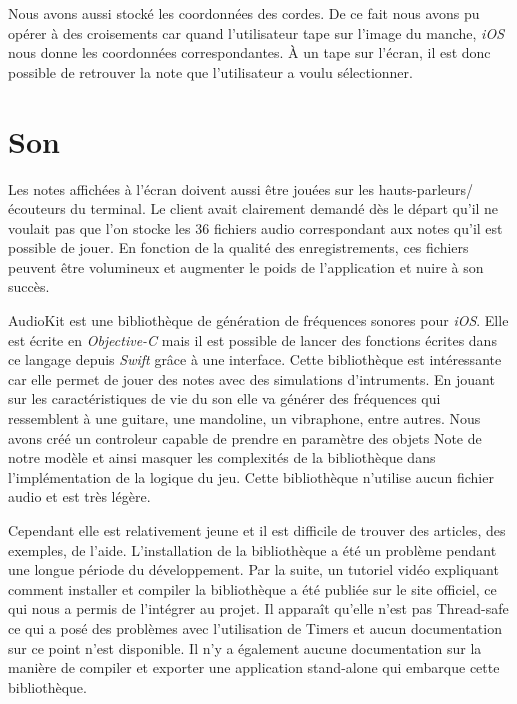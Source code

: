 \documentclass{scrreprt}
\begin{document}
Nous avons aussi stocké les coordonnées des cordes.
De ce fait nous avons pu opérer à des croisements car quand l'utilisateur tape sur l'image du manche, \textit{iOS} nous donne les coordonnées correspondantes.
À un tape sur l'écran, il est donc possible de retrouver la note que l'utilisateur a voulu sélectionner.
\newpage

\section{Son}
Les notes affichées à l'écran doivent aussi être jouées sur les hauts-parleurs/écouteurs du terminal.
Le client avait clairement demandé dès le départ qu'il ne voulait pas que l'on stocke les 36 fichiers audio correspondant aux notes qu'il est possible de jouer.
En fonction de la qualité des enregistrements, ces fichiers peuvent être volumineux et augmenter le poids de l'application et nuire à son succès.
\newline

AudioKit est une bibliothèque de génération de fréquences sonores pour \textit{iOS}.
Elle est écrite en \textit{Objective-C} mais il est possible de lancer des fonctions écrites dans ce langage depuis \textit{Swift} grâce à une interface.
Cette bibliothèque est intéressante car elle permet de jouer des notes avec des simulations d'intruments.
En jouant sur les caractéristiques de vie du son elle va générer des fréquences qui ressemblent à une guitare, une mandoline, un vibraphone, entre autres.
Nous avons créé un controleur capable de prendre en paramètre des objets Note de notre modèle et ainsi masquer les complexités de la bibliothèque dans l'implémentation de la logique du jeu.
Cette bibliothèque n'utilise aucun fichier audio et est très légère.
\newline

Cependant elle est relativement jeune et il est difficile de trouver des articles, des exemples, de l'aide.
L'installation de la bibliothèque a été un problème pendant une longue période du développement.
Par la suite, un tutoriel vidéo expliquant comment installer et compiler la bibliothèque a été publiée sur le site officiel, ce qui nous a permis de l'intégrer au projet.
Il apparaît qu'elle n'est pas Thread-safe ce qui a posé des problèmes avec l'utilisation de Timers et aucun documentation sur ce point n'est disponible.
Il n'y a également aucune documentation sur la manière de compiler et exporter une application stand-alone qui embarque cette bibliothèque.
\end{document}
